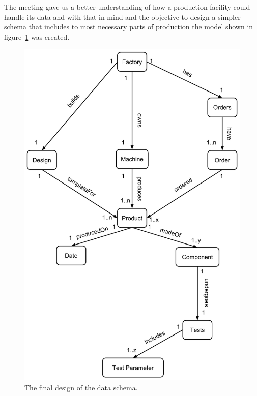 The meeting gave us a better understanding of how a production facility could handle its data and with that in mind and the objective to design a simpler schema that includes to most necessary parts of production the model shown in figure~\ref{fig:finalDesignOfSchema} was created.

\begin{figure}
  \includegraphics[width=\textwidth]{images/design/dataStructure}
  \caption{The final design of the data schema.}
  \label{fig:finalDesignOfSchema}
\end{figure}


